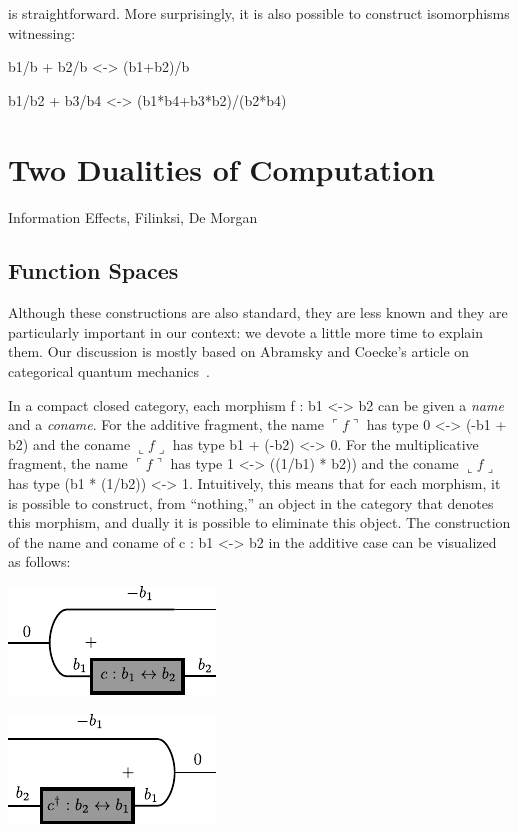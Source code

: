 \documentclass[preprint]{sigplanconf}
\newcommand{\fname}[1]{\ulcorner #1 \urcorner}
\newcommand{\fconame}[1]{\llcorner #1 \lrcorner}
\begin{document}
is straightforward. More surprisingly, it is also possible to construct
isomorphisms witnessing:

{{b1/b + b2/b <-> (b1+b2)/b}}

{{b1/b2 + b3/b4 <-> (b1*b4+b3*b2)/(b2*b4) }}


\section{Two Dualities of Computation}
\label{sub:hof}

Information Effects, Filinksi, De Morgan

\subsection{Function Spaces}

Although these constructions are also standard, they are less known and they
are particularly important in our context: we devote a little more time to
explain them. Our discussion is mostly based on Abramsky and Coecke's article
on categorical quantum mechanics~\cite{abramsky-2008}.

In a compact closed category, each morphism {{f : b1 <-> b2 }} can be given a
\emph{name} and a \emph{coname}. For the additive fragment, the name
$\fname{f}$ has type {{0 <-> (-b1 + b2)}} and the coname $\fconame{f}$ has type
{{b1 + (-b2) <-> 0}}. For the multiplicative fragment, the name $\fname{f}$ has
type {{1 <-> ((1/b1) * b2))}} and the coname $\fconame{f}$ has type 
{{(b1 * (1/b2)) <-> 1}}. Intuitively, this means that for each morphism, 
it is possible to construct, from ``nothing,'' an object in the category that 
denotes this morphism, and dually it is possible to eliminate this object.
The construction of the name and coname of {{c : b1 <-> b2}} in the additive case 
can be visualized as follows:

\begin{multicols}{2}
\begin{center}
  \includegraphics{diagrams/function.pdf}
\end{center}

\begin{center}
  \includegraphics{diagrams/delimc.pdf}
\end{center}  
\end{multicols}
\end{document}
